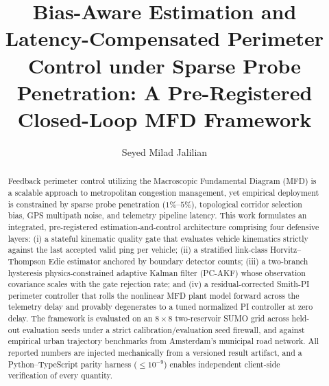 \documentclass[a4paper,fleqn]{cas-dc}
\begin{document}
\let\WriteBookmarks\relax

\def\floatpagepagefraction{8}
\def\textpagefraction{8}


\title[mode = title]{Bias-Aware Estimation and Latency-Compensated Perimeter Control under Sparse Probe Penetration: A Pre-Registered Closed-Loop MFD Framework}

\author[1]{Seyed Milad Jalilian}
\address[1]{Department of Civil, Architectural and Environmental Engineering,
University of Naples Federico II, Naples, Italy}



\begin{abstract}
Feedback perimeter control utilizing the Macroscopic Fundamental Diagram (MFD) is a scalable approach to metropolitan congestion management, yet empirical deployment is constrained by sparse probe penetration ($1\%$--$5\%$), topological corridor selection bias, GPS multipath noise, and telemetry pipeline latency. This work formulates an integrated, pre-registered estimation-and-control architecture comprising four defensive layers: (i) a stateful kinematic quality gate that evaluates vehicle kinematics strictly against the last accepted valid ping per vehicle; (ii) a stratified link-class Horvitz--Thompson Edie estimator anchored by boundary detector counts; (iii) a two-branch hysteresis physics-constrained adaptive Kalman filter (PC-AKF) whose observation covariance scales with the gate rejection rate; and (iv) a residual-corrected Smith-PI perimeter controller that rolls the nonlinear MFD plant model forward across the telemetry delay and provably degenerates to a tuned normalized PI controller at zero delay. The framework is evaluated on an $8\times 8$ two-reservoir SUMO grid across \EvalSeedCount{} held-out evaluation seeds under a strict calibration/evaluation seed firewall, and against empirical urban trajectory benchmarks from Amsterdam's municipal road network. All reported numbers are injected mechanically from a versioned result artifact, and a Python--TypeScript parity harness ($\le 10^{-9}$) enables independent client-side verification of every quantity.
\end{abstract}
\end{document}
